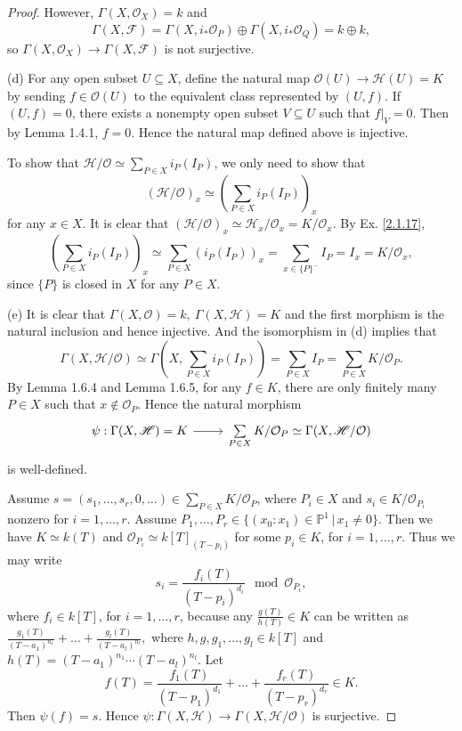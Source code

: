\begin{proof}
	However, $\Gamma(X,\mathcal{O}_X)=k$ and $$\Gamma(X,\mathscr{F})=\Gamma(X,i_*\mathcal{O}_P)\oplus\Gamma(X,i_*\mathcal{O}_Q)=k\oplus k,$$ so $\Gamma(X,\mathcal{O}_X)\to\Gamma(X,\mathscr{F})$ is not surjective.
	
	(d) For any open subset $U\subseteq X$, define the natural map $\mathcal{O}(U)\to\mathscr{H}(U)=K$ by sending $f\in\mathcal{O}(U)$ to the equivalent class represented by $(U,f)$. If $(U,f)=0$, there exists a nonempty open subset $V\subseteq U$ such that $f|_V=0$. Then by Lemma 1.4.1, $f=0$. Hence the natural map defined above is injective.
	
	To show that $\mathscr{H}/\mathcal{O}\simeq\sum_{P\in X}i_P(I_P)$, we only need to show that $$(\mathscr{H}/\mathcal{O})_x\simeq\left(\sum_{P\in X}i_P(I_P)\right)_x$$ for any $x\in X$. It is clear that $(\mathscr{H}/\mathcal{O})_x\simeq\mathscr{H}_x/\mathcal{O}_x=K/\mathcal{O}_x$. By Ex. \ref{2.1.17}, $$\left(\sum_{P\in X}i_P(I_P)\right)_x\simeq\sum_{P\in X}(i_P(I_P))_x=\sum_{x\in\{P\}^-}I_P=I_x=K/\mathcal{O}_x,$$ since $\{P\}$ is closed in $X$ for any $P\in X$.
	
	(e) It is clear that $\Gamma(X,\mathcal{O})=k,\ \Gamma(X,\mathscr{H})=K$ and the first morphism is the natural inclusion and hence injective. And the isomorphism in (d) implies that $$\Gamma(X,\mathscr{H}/\mathcal{O})\simeq\Gamma\left(X,\sum_{P\in X}i_P(I_P)\right)=\sum_{P\in X}I_P=\sum_{P\in X}K/\mathcal{O}_P.$$ By Lemma 1.6.4 and Lemma 1.6.5, for any $f\in K$, there are only finitely many $P\in X$ such that $x\notin\mathcal{O}_P$. Hence the natural morphism 
	\begin{equation*}
		\begin{tikzcd}
			{\psi:\Gamma(X,\mathscr{H})=K} \arrow[r] & {\sum\limits_{P\in X}K/\mathcal{O}_P\simeq\Gamma(X,\mathscr{H}/\mathcal{O})}
		\end{tikzcd}
	\end{equation*}
	is well-defined.
	
	Assume $s=(s_1,\dots,s_r,0,\dots)\in\sum_{P\in X}K/\mathcal{O}_P$, where $P_i\in X$ and $s_i\in K/\mathcal{O}_{P_i}$ nonzero for $i=1,\dots,r$. Assume $P_1,\dots,P_r\in\{(x_0:x_1)\in\mathbb{P}^1\,|\,x_1\neq0\}$. Then we have $K\simeq k(T)$ and $\mathcal{O}_{P_i}\simeq k[T]_{(T-p_i)}$ for some $p_i\in K$, for $i=1,\dots,r$. Thus we may write $$s_i=\frac{f_i(T)}{(T-p_i)^{d_i}}\mod\mathcal{O}_{P_i},$$ where $f_i\in k[T]$, for $i=1,\dots,r$, because any $\frac{g(T)}{h(T)}\in K$ can be written as $\frac{g_1(T)}{(T-a_1)^{n_1}}+\dots+\frac{g_l(T)}{(T-a_l)^{n_l}},$ where $h,g,g_1,\dots,g_l\in k[T]$ and $h(T)=(T-a_1)^{n_1}\cdots(T-a_l)^{n_l}$. Let $$f(T)=\frac{f_1(T)}{(T-p_1)^{d_1}}+\dots+\frac{f_r(T)}{(T-p_r)^{d_r}}\in K.$$ Then $\psi(f)=s$. Hence $\psi:\Gamma(X,\mathscr{H})\to\Gamma(X,\mathscr{H}/\mathcal{O})$ is surjective.
	

\end{proof}
